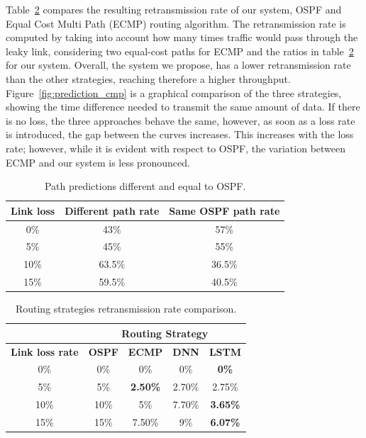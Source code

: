 Table~\ref{tab:retransmission_rate} compares the resulting retransmission rate of our system, OSPF and Equal Cost Multi Path (ECMP) routing algorithm. The retransmission rate is computed by taking into account how many times traffic would pass through the leaky link, considering two equal-cost paths for ECMP and the ratios in table~\ref{tab:retransmission_rate} for our system. Overall, the system we propose, has a lower retransmission rate than the other strategies, reaching therefore a higher throughput. Figure~\ref{fig:prediction_cmp} is a graphical comparison of the three strategies, showing the time difference needed to transmit the same amount of data. If there is no loss, the three approaches behave the same, however, as soon as a loss rate is introduced, the gap between the curves increases. This increases with the loss rate; however, while it is evident with respect to OSPF, the variation between ECMP and our system is less pronounced.

\begin{table}[]
\centering
{%
\begin{tabular}{|c|c|c|}
\hline
\multicolumn{1}{|l|}{\textbf{Link loss}} & \multicolumn{1}{l|}{\textbf{Different path rate}} & \multicolumn{1}{l|}{\textbf{Same OSPF path rate}} \\ \hline
0\% & 43\% & 57\% \\ \hline
5\% &45\% & 55\% \\ \hline
10\% & 63.5\% & 36.5\% \\ \hline
15\% & 59.5\% & 40.5\% \\ \hline
\end{tabular}%
}
\caption{Path predictions different and equal to OSPF.}
\label{tab:same_path_rate}
\end{table}

\begin{table}[]
\centering
\begin{tabular}{|c|c|c|c|c|}
\hline
\multicolumn{1}{|l|}{}  & \multicolumn{4}{c|}{\textbf{Routing Strategy}}                                          \\ \hline
\textbf{Link loss rate} & \textbf{OSPF} & \textbf{ECMP} & \textbf{DNN} &\textbf{LSTM} \\
\hline
0\% & 0\% & 0\% & 0\% & \textbf{0\%}\\
\hline
5\%  & 5\% & \textbf{2.50\%} & 2.70\%	 &2.75\%\\
\hline
10\% & 10\% & 5\% & 7.70\% & \textbf{3.65\%}\\
\hline
15\% & 15\% & 7.50\% & 9\% &\textbf{6.07\%}\\
\hline
\end{tabular}%
\caption{Routing strategies retransmission rate comparison.}
\label{tab:retransmission_rate}
\end{table}

